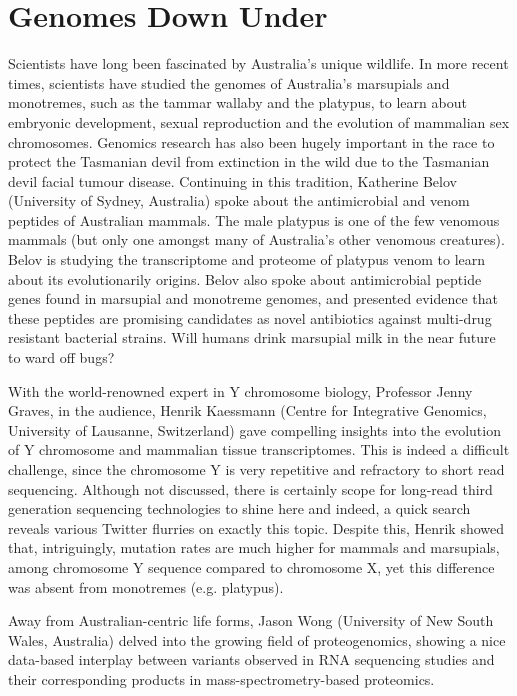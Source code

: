 \documentclass[twocolumn]{bmcart}%
\begin{document}
\section*{Genomes Down Under}
Scientists have long been fascinated by Australia's unique wildlife. In more recent times, scientists have studied the genomes of Australia's marsupials and monotremes, such as the tammar wallaby and the platypus, to learn about embryonic development, sexual reproduction and the evolution of mammalian sex chromosomes. Genomics research has also been hugely important in the race to protect the Tasmanian devil from extinction in the wild due to the Tasmanian devil facial tumour disease. Continuing in this tradition, Katherine Belov (University of Sydney, Australia) spoke about the antimicrobial and venom peptides of Australian mammals. The male platypus is one of the few venomous mammals (but only one amongst many of Australia's other venomous creatures). Belov is studying the transcriptome and proteome of platypus venom to learn about its evolutionarily origins. Belov also spoke about antimicrobial peptide genes found in marsupial and monotreme genomes, and presented evidence that these peptides are promising candidates as novel antibiotics against multi-drug resistant bacterial strains.  Will humans drink marsupial milk in the near future to ward off bugs?

With the world-renowned expert in Y chromosome biology, Professor Jenny Graves, in the audience, Henrik Kaessmann (Centre for Integrative Genomics, University of Lausanne, Switzerland) gave compelling insights into the evolution of Y chromosome and mammalian tissue transcriptomes.  This is indeed a difficult challenge, since the chromosome Y is very repetitive and refractory to short read sequencing. Although not discussed, there is certainly scope for long-read third generation sequencing technologies to shine here and indeed, a quick search reveals various Twitter flurries on exactly this topic.  Despite this, Henrik showed that, intriguingly, mutation rates are much higher for mammals and marsupials, among chromosome Y sequence compared to chromosome X, yet this difference was absent from monotremes (e.g. platypus).

Away from Australian-centric life forms, Jason Wong (University of New South Wales, Australia) delved into the growing field of proteogenomics, showing a nice data-based interplay between variants observed in RNA sequencing studies and their corresponding products in mass-spectrometry-based proteomics.
\end{document}
